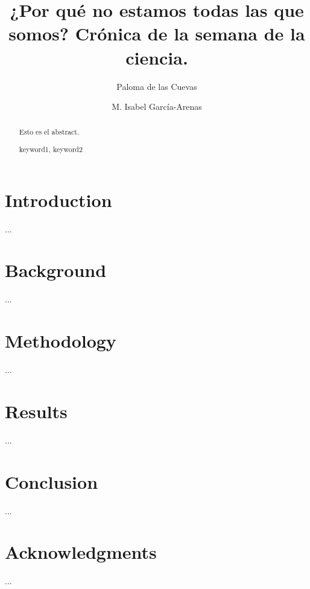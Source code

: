 \documentclass[runningheads,a4paper]{llncs}
\newcommand{\keywords}[1]{\par\addvspace\baselineskip
\noindent\keywordname\enspace\ignorespaces#1}
\begin{document}
\mainmatter

\title{¿Por qu\'{e} no estamos todas las que somos? Cr\'{o}nica de la semana de la ciencia.}

\author{Paloma de las Cuevas \and M. Isabel Garc\'{i}a-Arenas}


\maketitle


\begin{abstract}

Esto es el abstract.

\keywords{keyword1, keyword2}
\end{abstract}

\section{Introduction}
\label{sec:intro}

...

\section{Background}
\label{sec:background}

...

\section{Methodology}
\label{methodology}

...

\section{Results}
\label{sec:results}

...

\section{Conclusion}
\label{conclusion}

...

\section*{Acknowledgments}

...



\end{document}
